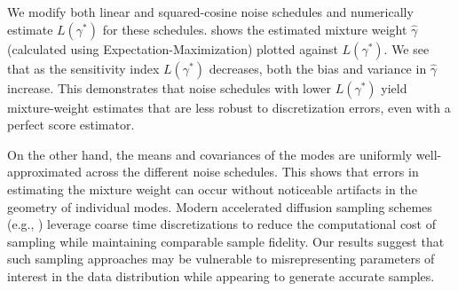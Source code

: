 \documentclass[11pt]{article}
\theoremstyle{plain}
\newcommand{\1}{\mathbbm{1}}
\begin{document}
We modify both linear and squared-cosine noise schedules and numerically estimate $L(\gamma^*)$ for these schedules.   shows the estimated mixture weight $\hat\gamma$ (calculated using Expectation-Maximization) plotted against $L(\gamma^*)$. We see that as the sensitivity index $L(\gamma^*)$ decreases, both the bias and variance in $\hat\gamma$ increase. This demonstrates that noise schedules with lower $L(\gamma^*)$ yield mixture-weight estimates that are less robust to discretization errors, even with a perfect score estimator.

On the other hand, the means and covariances of the modes are uniformly well-approximated across the different noise schedules. This shows that errors in estimating the mixture weight can occur without noticeable artifacts in the geometry of individual modes. Modern accelerated diffusion sampling schemes (e.g., \citep{song2021denoising}) leverage coarse time discretizations to reduce the computational cost of sampling while maintaining comparable sample fidelity. Our results suggest that such sampling approaches may be vulnerable to misrepresenting parameters of interest in the data distribution while appearing to generate accurate samples.
\end{document}
